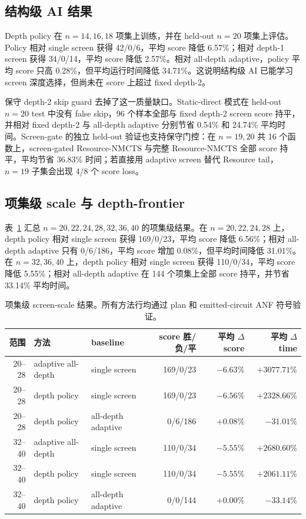 \documentclass[UTF8,fontset=macnew,11pt]{ctexart}
\newcommand{\method}{Resource-NMCTS}
\begin{document}
\subsection{结构级 AI 结果}

Depth policy 在 $n=14,16,18$ 项集上训练，并在 held-out $n=20$ 项集上评估。Policy 相对 single screen 获得 42/0/6，平均 score 降低 6.57\%；相对 depth-1 screen 获得 34/0/14，平均 score 降低 2.57\%。相对 all-depth adaptive，policy 平均 score 只高 0.28\%，但平均运行时间降低 34.71\%。这说明结构级 AI 已能学习 screen 深度选择，但尚未在 score 上超过 fixed depth-2。

保守 depth-2 skip guard 去掉了这一质量缺口。Static-direct 模式在 held-out $n=20$ test 中没有 false skip，96 个样本全部与 fixed depth-2 screen score 持平，并相对 fixed depth-2 与 all-depth adaptive 分别节省 0.54\% 和 24.74\% 平均时间。Screen-gate 的独立 held-out 验证也支持保守门控：在 $n=19,20$ 共 16 个函数上，screen-gated \method{} 与完整 \method{} 全部 score 持平，平均节省 36.83\% 时间；若直接用 adaptive screen 替代 Resource tail，$n=19$ 子集会出现 4/8 个 score loss。

\subsection{项集级 scale 与 depth-frontier}

表~\ref{tab:scale} 汇总 $n=20,22,24,28,32,36,40$ 的项集级结果。在 $n=20,22,24,28$ 上，depth policy 相对 single screen 获得 169/0/23，平均 score 降低 6.56\%；相对 all-depth adaptive 只有 0/6/186，平均 score 增加 0.08\%，但平均时间降低 31.01\%。在 $n=32,36,40$ 上，depth policy 相对 single screen 获得 110/0/34，平均 score 降低 5.55\%；相对 all-depth adaptive 在 144 个项集上全部 score 持平，并节省 33.14\% 平均时间。

\begin{table}[H]
\centering
\scriptsize
\caption{项集级 screen-scale 结果。所有方法行均通过 plan 和 emitted-circuit ANF 符号验证。}
\label{tab:scale}
\begin{tabular}{rllrrr}
\toprule
范围 & 方法 & baseline & score 胜/负/平 & 平均 $\Delta$ score & 平均 $\Delta$ time \\
\midrule
20--28 & adaptive all-depth & single screen & 169/0/23 & $-6.63\%$ & $+3077.71\%$ \\
20--28 & depth policy & single screen & 169/0/23 & $-6.56\%$ & $+2328.66\%$ \\
20--28 & depth policy & all-depth adaptive & 0/6/186 & $+0.08\%$ & $-31.01\%$ \\
32--40 & adaptive all-depth & single screen & 110/0/34 & $-5.55\%$ & $+2680.60\%$ \\
32--40 & depth policy & single screen & 110/0/34 & $-5.55\%$ & $+2061.11\%$ \\
32--40 & depth policy & all-depth adaptive & 0/0/144 & $+0.00\%$ & $-33.14\%$ \\
\bottomrule
\end{tabular}
\end{table}
\end{document}
